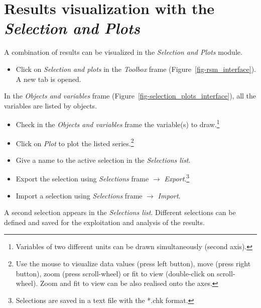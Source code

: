 \documentclass[
  letterpaper,
  DIV=11,
  numbers=noendperiod]{scrreprt}
\providecommand{\tightlist}{%
  \setlength{\itemsep}{0pt}\setlength{\parskip}{0pt}}\usepackage{longtable,booktabs,array}
\begin{document}
\hypertarget{sec-user_hydro_hydrau_simulation_selection_plots}{%
\chapter{\texorpdfstring{Results visualization with the \emph{Selection
and
Plots}}{Results visualization with the Selection and Plots}}\label{sec-user_hydro_hydrau_simulation_selection_plots}}

A combination of results can be visualized in the \emph{Selection and
Plots} module.

\begin{itemize}
\tightlist
\item
  {Click on \emph{Selection and plots} in the \emph{Toolbox} frame
  (Figure~\ref{fig-rsm_interface})}. A new tab is opened.
\end{itemize}

In the \emph{Objects and variables} frame
(Figure~\ref{fig-selection_plots_interface}), all the variables are
listed by objects.

\begin{itemize}
\item
  {Check in the \emph{Objects and variables} frame the variable(s) to
  draw.\footnote{Variables of two different units can be drawn
    simultaneously (second axis).}}
\item
  {Click on \emph{Plot} to plot the listed series.\footnote{Use the
    mouse to visualize data values (press left button), move (press
    right button), zoom (press scroll-wheel) or fit to view
    (double-click on scroll-wheel). Zoom and fit to view can be also
    realised onto the axes.}}
\item
  {Give a name to the active selection in the \emph{Selections list}.}
\item
  {Export the selection using \emph{Selections} frame \(\rightarrow\)
  \emph{Export}.\footnote{Selections are saved in a text file with the
    *.chk format.}}
\item
  {Import a selection using \emph{Selections} frame \(\rightarrow\)
  \emph{Import}.}
\end{itemize}

A second selection appears in the \emph{Selections list}. Different
selections can be defined and saved for the exploitation and analysis of
the results.
\end{document}
